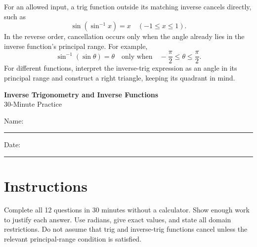 \documentclass[12pt]{article}
\begin{document}
For an allowed input, a trig function outside its matching inverse cancels directly, such as
\[
  \sin(\sin^{-1}x)=x \quad(-1\le x\le1).
\]
In the reverse order, cancellation occurs only when the angle already lies in the inverse function's principal range. For example,
\[
  \sin^{-1}(\sin\theta)=\theta
  \quad\text{only when}\quad
  -\frac\pi2\le\theta\le\frac\pi2.
\]
For different functions, interpret the inverse-trig expression as an angle in its principal range and construct a right triangle, keeping its quadrant in mind.

\newpage
\begin{center}
  {\Large\textbf{Inverse Trigonometry and Inverse Functions}}\\[3pt]
  {\large 30-Minute Practice}
\end{center}

\noindent Name: \rule{2.7in}{0.4pt}\hfill Date: \rule{1.5in}{0.4pt}

\section*{Instructions}
Complete all 12 questions in 30 minutes without a calculator. Show enough work to justify each answer. Use radians, give exact values, and state all domain restrictions. Do not assume that trig and inverse-trig functions cancel unless the relevant principal-range condition is satisfied.
\end{document}
